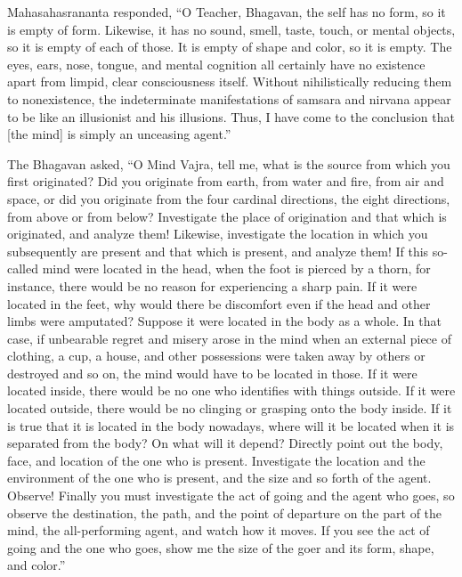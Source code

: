 \documentclass[a4paper,11pt,twoside,final]{book}
\begin{document}
Mahasahasrananta responded, ``O Teacher, Bhagavan, the self has no
form, so it is empty of form. Likewise, it has no sound, smell, taste,
touch, or mental objects, so it is empty of each of those. It is empty
of shape and color, so it is empty. The eyes, ears, nose, tongue, and
mental cognition all certainly have no existence apart from limpid,
clear consciousness itself.  Without nihilistically reducing them to
nonexistence, the indeterminate manifestations of samsara and nirvana
appear to be like an illusionist and his illusions. Thus, I have come
to the conclusion that [the mind] is simply an unceasing agent.''

The Bhagavan asked, ``O Mind Vajra, tell me, what is the source from
which you first originated? Did you originate from earth, from water
and fire, from air and space, or did you originate from the four
cardinal directions, the eight directions, from above or from below?
Investigate the place of origination and that which is originated, and
analyze them! Likewise, investigate the location in which you
subsequently are present and that which is present, and analyze them!
If this so-called mind were located in the head, when the foot is
pierced by a thorn, for instance, there would be no reason for
experiencing a sharp pain. If it were located in the feet, why would
there be discomfort even if the head and other limbs were amputated?
Suppose it were located in the body as a whole. In that case, if
unbearable regret and misery arose in the mind when an external piece
of clothing, a cup, a house, and other possessions were taken away by
others or destroyed and so on, the mind would have to be located in
those. If it were located inside, there would be no one who identifies
with things outside. If it were located outside, there would be no
clinging or grasping onto the body inside. If it is true that it is
located in the body nowadays, where will it be located when it is
separated from the body? On what will it depend?  Directly point out
the body, face, and location of the one who is present.  Investigate
the location and the environment of the one who is present, and the
size and so forth of the agent. Observe! Finally you must investigate
the act of going and the agent who goes, so observe the destination,
the path, and the point of departure on the part of the mind, the
all-performing agent, and watch how it moves. If you see the act of
going and the one who goes, show me the size of the goer and its form,
shape, and color.''
\end{document}
